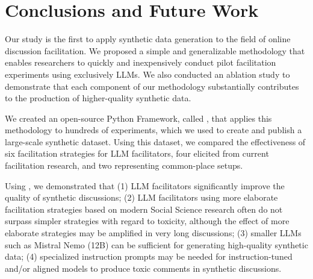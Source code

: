 %
\section{Conclusions and Future Work}

Our study is the first to apply synthetic data generation to the field of online discussion facilitation. We proposed a simple and generalizable methodology that enables researchers to quickly and inexpensively conduct pilot facilitation experiments using exclusively \acp{LLM}. We also conducted an ablation study to demonstrate that each component of our methodology substantially contributes to the production of higher-quality synthetic data.

We created an open-source Python Framework, called \syndisco, that applies this methodology to hundreds of experiments, which we used to create and publish \vmd a large-scale synthetic dataset. Using this dataset, we compared the effectiveness of six facilitation strategies for \ac{LLM} facilitators, four elicited from current facilitation research, and two representing common-place setups. 

Using \syndisco, we demonstrated that (1) \ac{LLM} facilitators significantly improve the quality of synthetic discussions; (2) \ac{LLM} facilitators using more elaborate facilitation strategies based on modern Social Science research often do not surpass simpler strategies with regard to toxicity, although the effect of more elaborate strategies may be amplified in very long discussions; (3) smaller \acp{LLM} such as Mistral Nemo (12B) can be sufficient for generating high-quality synthetic data; (4) specialized instruction prompts may be needed for instruction-tuned and/or aligned models to produce toxic comments in synthetic discussions. 